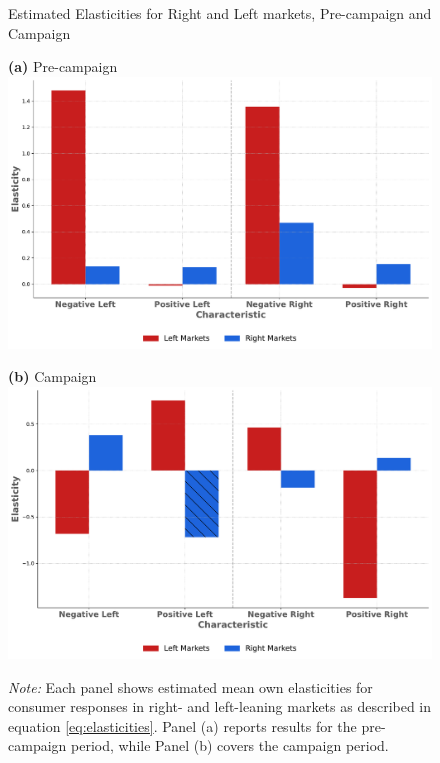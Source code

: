 \documentclass[12pt]{article}
\begin{document}
\begin{figure}[ht]
	\centering
	\caption{Estimated Elasticities for Right and Left markets, Pre-campaign and Campaign}
	
	\vspace{0.5em} %
	
	\begin{minipage}{0.45\textwidth}
		\centering
		\textbf{(a)} Pre-campaign\\
		\includegraphics[width=\linewidth]{figures/elasticities_pre_campaign}
	\end{minipage}
	\hfill
	\begin{minipage}{0.45\textwidth}
		\centering
				\vspace{1.5em}
		\textbf{(b)} Campaign\\

		\includegraphics[width=\linewidth]{figures/elasticities_campaign}
		\label{fig:2figsA}
	\end{minipage}
	
	\vspace{0.5em} %
	
	\captionsetup{justification=justified}
	\caption*{\textit{Note:} \small Each panel shows estimated mean own elasticities for consumer responses in right- and left-leaning markets as described in equation \ref{eq:elasticities}. Panel (a) reports results for the pre-campaign period, while Panel (b) covers the campaign period.}
\end{figure}
\end{document}
